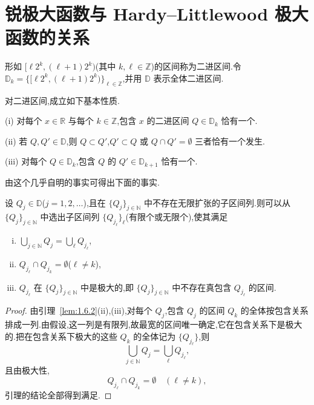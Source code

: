 \section{锐极大函数与 Hardy--Littlewood 极大函数的关系}\label{sec:1.6}


\begin{definition}\label{def:1.6.1}
形如 $[\ell 2^{k}, (\ell + 1)2^{k})$(其中 $k, \ell \in \mathbb{Z}$)的区间称为二进区间.令 $\mathbb{D}_{k} = \{[\ell 2^{k}, (\ell + 1)2^{k})\}_{\ell \in \mathbb{Z}}$,并用 $\mathbb{D}$ 表示全体二进区间.
\end{definition}

对二进区间,成立如下基本性质.

\begin{lemma}\label{lem:1.6.2}
(i) 对每个 $x \in \mathbb{R}$ 与每个 $k \in \mathbb{Z}$,包含 $x$ 的二进区间 $Q \in \mathbb{D}_{k}$ 恰有一个.

(ii) 若 $Q, Q' \in \mathbb{D}$,则 $Q \subset Q'$,$Q' \subset Q$ 或 $Q \cap Q' = \emptyset$ 三者恰有一个发生.

(iii) 对每个 $Q \in \mathbb{D}_{k}$,包含 $Q$ 的 $Q' \in \mathbb{D}_{k+1}$ 恰有一个.
\end{lemma}

由这个几乎自明的事实可得出下面的事实.

\begin{lemma}\label{lem:1.6.3}
设 $Q_{j} \in \mathbb{D}$($j = 1, 2, \ldots$),且在 $\{Q_{j}\}_{j \in \mathbb{N}}$ 中不存在无限扩张的子区间列.则可以从 $\{Q_{j}\}_{j \in \mathbb{N}}$ 中选出子区间列 $\{Q_{j_{\ell}}\}_{\ell}$(有限个或无限个),使其满足
\begin{enumerate}[(i)]
\item $\bigcup_{j \in \mathbb{N}}Q_{j} = \bigcup_{\ell}Q_{j_{\ell}}$,
\item $Q_{j_{\ell}} \cap Q_{j_{k}} = \emptyset$($\ell \neq k$),
\item $Q_{j_{\ell}}$ 在 $\{Q_{j}\}_{j \in \mathbb{N}}$ 中是极大的,即 $\{Q_{j}\}_{j \in \mathbb{N}}$ 中不存在真包含 $Q_{j_{\ell}}$ 的区间.
\end{enumerate}
\end{lemma}

\begin{proof}
由引理~\ref{lem:1.6.2}(ii),(iii),对每个 $Q_{j}$,包含 $Q_{j}$ 的区间 $Q_{k}$ 的全体按包含关系排成一列.由假设,这一列是有限列,故最宽的区间唯一确定,它在包含关系下是极大的.把在包含关系下极大的这些 $Q_{k}$ 的全体记为 $\{Q_{j_{\ell}}\}$,则
\begin{equation*}
\bigcup_{j \in \mathbb{N}}Q_{j} = \bigcup_{\ell}Q_{j_{\ell}},
\end{equation*}
且由极大性,
\begin{equation*}
Q_{j_{\ell}} \cap Q_{j_{k}} = \emptyset \quad (\ell \neq k),
\end{equation*}
引理的结论全部得到满足.
\end{proof}

